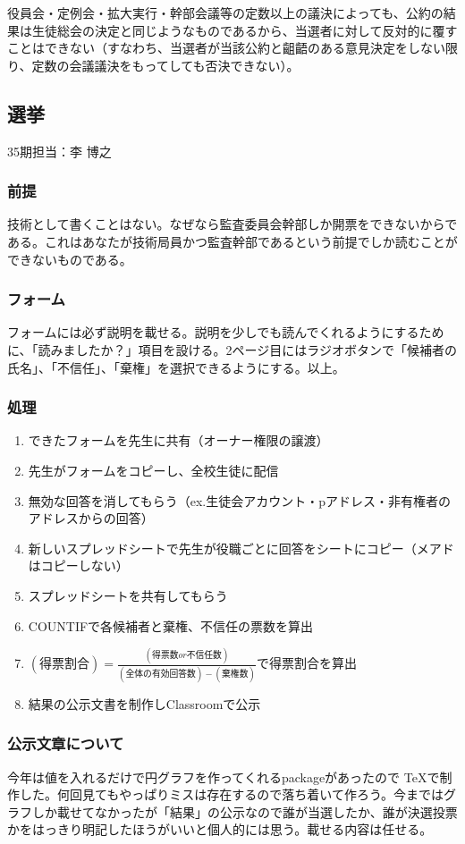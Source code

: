 \documentclass[dvipdfmx,jb5]{jarticle}
\begin{document}
役員会・定例会・拡大実行・幹部会議等の定数以上の議決によっても、公約の結果は生徒総会の決定と同じようなものであるから、当選者に対して反対的に覆すことはできない（すなわち、当選者が当該公約と齟齬のある意見決定をしない限り、定数の会議議決をもってしても否決できない）。
\subsection{選挙}
35期担当：李 博之
\subsubsection{前提}
技術として書くことはない。なぜなら監査委員会幹部しか開票をできないからである。これはあなたが技術局員かつ監査幹部であるという前提でしか読むことができないものである。
\subsubsection{フォーム}
フォームには必ず説明を載せる。説明を少しでも読んでくれるようにするために、「読みましたか？」項目を設ける。2ページ目にはラジオボタンで「候補者の氏名」、「不信任」、「棄権」を選択できるようにする。以上。
\subsubsection{処理}
\begin{enumerate}
\item できたフォームを先生に共有（オーナー権限の譲渡）
\item 先生がフォームをコピーし、全校生徒に配信
\item 無効な回答を消してもらう（ex.生徒会アカウント・pアドレス・非有権者のアドレスからの回答）
\item 新しいスプレッドシートで先生が役職ごとに回答をシートにコピー（メアドはコピーしない）
\item スプレッドシートを共有してもらう
\item COUNTIFで各候補者と棄権、不信任の票数を算出
\item $(得票割合)=\frac{(得票数or不信任数)}{(全体の有効回答数) - (棄権数)}$で得票割合を算出
\item 結果の公示文書を制作しClassroomで公示
\end{enumerate}
\subsubsection{公示文章について}
今年は値を入れるだけで円グラフを作ってくれるpackageがあったので \TeX で制作した。何回見てもやっぱりミスは存在するので落ち着いて作ろう。今まではグラフしか載せてなかったが「結果」の公示なので誰が当選したか、誰が決選投票かをはっきり明記したほうがいいと個人的には思う。載せる内容は任せる。
\end{document}
